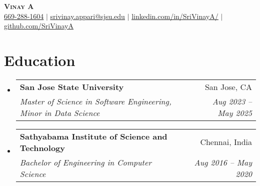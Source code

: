 \documentclass{article}
\makeatletter
\newcommand{\resumeSubheading}[4]{
  \vspace{-2pt}\item
    \begin{tabular*}{0.97\textwidth}[t]{l@{\extracolsep{\fill}}r}
      \textbf{#1} & #2 \\
      \textit{\small#3} & \textit{\small #4} \\
    \end{tabular*}\vspace{-7pt}
}
\newcommand{\resumeSubHeadingListStart}{\begin{itemize}[leftmargin=0.15in, label={}]}
\newcommand{\resumeSubHeadingListEnd}{\end{itemize}}
\makeatother
\begin{document}
\begin{center}
\textbf{\Huge \scshape Vinay A} \\ \vspace{1pt}
\small \href{tel:6692881604}{669-288-1604} $|$ \href{mailto:srivinay.appari@sjsu.edu}{\underline{srivinay.appari@sjsu.edu}} $|$ \href{https://linkedin.com/in/SriVinayA/}{\underline{linkedin.com/in/SriVinayA/}} $|$ \href{https://github.com/SriVinayA}{\underline{github.com/SriVinayA}}
\end{center}


\section{Education}
\resumeSubHeadingListStart
\resumeSubheading
{San Jose State University}{San Jose, CA}
{Master of Science in Software Engineering, Minor in Data Science}{Aug 2023 – May 2025}
\resumeSubheading
{Sathyabama Institute of Science and Technology}{Chennai, India}
{Bachelor of Engineering in Computer Science}{Aug 2016 – May 2020}
\resumeSubHeadingListEnd



\end{document}
